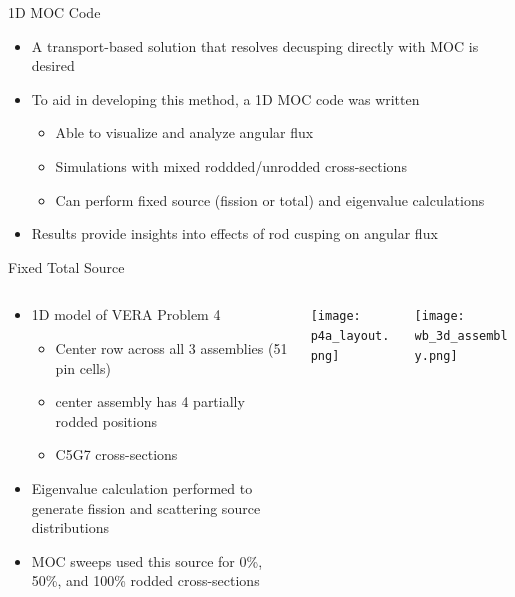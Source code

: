 \begin{frame}[t]{1D MOC Code}
    
    \begin{itemize}
      \item A transport-based solution that resolves decusping directly with 
      MOC is desired
      \item To aid in developing this method, a 1D MOC code was written
      \begin{itemize}
        \item Able to visualize and analyze angular flux
        \item Simulations with mixed roddded/unrodded cross-sections
        \item Can perform fixed source (fission or total) and eigenvalue 
        calculations
      \end{itemize}
      \item Results provide insights into effects of rod cusping on angular flux
    \end{itemize}
    
\end{frame}


\begin{frame}[t]{Fixed Total Source}

\begin{columns}
    \begin{column}{0.5\textwidth}
\begin{itemize}
  \item 1D model of VERA Problem 4
  \begin{itemize}
    \item Center row across all 3 assemblies (51 pin cells)
    \item center assembly has 4 partially rodded positions
    \item C5G7 cross-sections \cite{EELewisC5G72003,EELewisC5G7extended2005}
  \end{itemize}
  \item Eigenvalue calculation performed to generate fission and scattering 
  source 
  distributions
  \item MOC sweeps used this source for 0\%, 50\%, and 100\% rodded 
  cross-sections
\end{itemize}
\end{column}
\begin{column}{0.28\textwidth}
\texttt{[image: p4a\_layout.png]}
\end{column}
\begin{column}{0.22\textwidth}
\texttt{[image: wb\_3d\_assembly.png]}
\end{column}
\end{columns}

\end{frame}

